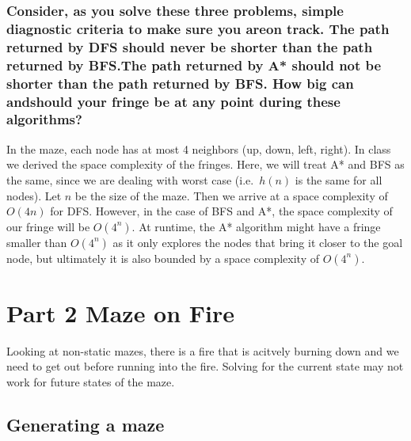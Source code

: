 \documentclass[11pt]{article}
\begin{document}
    \hypertarget{consider-as-you-solve-these-three-problems-simple-diagnostic-criteria-to-make-sure-you-areon-track.-the-path-returned-by-dfs-should-never-be-shorter-than-the-path-returned-by-bfs.the-path-returned-by-a-should-not-be-shorter-than-the-path-returned-by-bfs.-how-big-can-andshould-your-fringe-be-at-any-point-during-these-algorithms}{%
\subsubsection{Consider, as you solve these three problems, simple
diagnostic criteria to make sure you areon track. The path returned by
DFS should never be shorter than the path returned by BFS.The path
returned by A* should not be shorter than the path returned by BFS. How
big can andshould your fringe be at any point during these
algorithms?}\label{consider-as-you-solve-these-three-problems-simple-diagnostic-criteria-to-make-sure-you-areon-track.-the-path-returned-by-dfs-should-never-be-shorter-than-the-path-returned-by-bfs.the-path-returned-by-a-should-not-be-shorter-than-the-path-returned-by-bfs.-how-big-can-andshould-your-fringe-be-at-any-point-during-these-algorithms}}

In the maze, each node has at most 4 neighbors (up, down, left, right).
In class we derived the space complexity of the fringes. Here, we will
treat A* and BFS as the same, since we are dealing with worst case
(i.e.~\(h(n)\) is the same for all nodes). Let \(n\) be the size of the
maze. Then we arrive at a space complexity of \(O(4n)\) for DFS.
However, in the case of BFS and A*, the space complexity of our fringe
will be \(O(4^n)\). At runtime, the A* algorithm might have a fringe
smaller than \(O(4^n)\) as it only explores the nodes that bring it
closer to the goal node, but ultimately it is also bounded by a space
complexity of \(O(4^n)\).

    \hypertarget{part-2-maze-on-fire}{%
\section{Part 2 Maze on Fire}\label{part-2-maze-on-fire}}

Looking at non-static mazes, there is a fire that is acitvely burning
down and we need to get out before running into the fire. Solving for
the current state may not work for future states of the maze.

    \hypertarget{generating-a-maze}{%
\subsection{Generating a maze}\label{generating-a-maze}}
\end{document}
